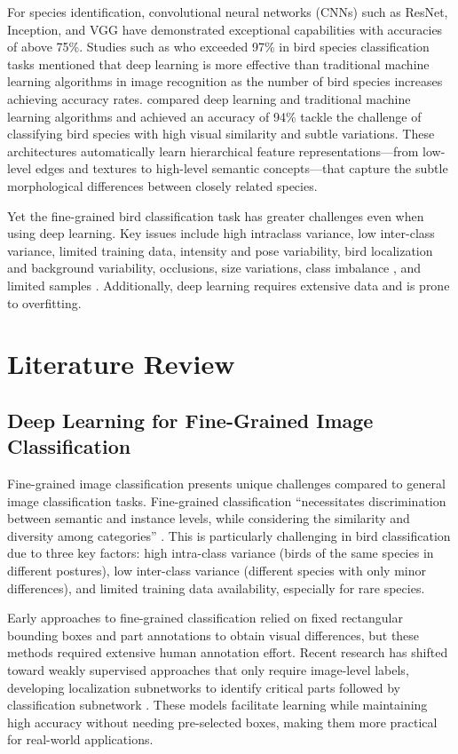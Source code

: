 \documentclass[a4paper,12pt]{report}
\begin{document}
For species identification, convolutional neural networks (CNNs) such as ResNet, Inception, and VGG have demonstrated exceptional capabilities \cite{essay101313} with accuracies of above 75\%. Studies such as \citep{transferln97} who exceeded 97\% in bird species classification tasks mentioned that deep learning is more effective than traditional machine learning algorithms in image recognition as the number of bird species increases achieving accuracy rates. \citep{ALFATEMI2024558} compared deep learning and traditional machine learning algorithms and achieved an accuracy of 94\% tackle the challenge of classifying bird species with high visual similarity and subtle variations. These architectures automatically learn hierarchical feature representations—from low-level edges and textures to high-level semantic concepts—that capture the subtle morphological differences between closely related species.

Yet the fine-grained bird classification task has greater challenges even when using deep learning. Key issues include high intraclass variance, low inter-class variance, limited training data, intensity and pose variability, bird localization and background variability, occlusions, size variations, class imbalance \citep{10.1007/978-981-15-1387-9_3}, and limited samples\cite{source3} \citep{ani13020264}. Additionally, deep learning requires extensive data and is prone to overfitting. 

\newpage
\chapter{Literature Review}
\section*{Deep Learning for Fine-Grained Image Classification}
Fine-grained image classification presents unique challenges compared to general image classification tasks. Fine-grained classification \enquote{necessitates discrimination between semantic and instance levels, while considering the similarity and diversity among categories} \citep{Lu2024}. This is particularly challenging in bird classification due to three key factors: high intra-class variance (birds of the same species in different postures), low inter-class variance (different species with only minor differences), and limited training data availability, especially for rare species\citep{Lu2024}.

Early approaches to fine-grained classification relied on fixed rectangular bounding boxes and part annotations to obtain visual differences, but these methods required extensive human annotation effort. Recent research has shifted toward weakly supervised approaches that only require image-level labels, developing localization subnetworks to identify critical parts followed by classification subnetwork \citep{Lu2024}. These models facilitate learning while maintaining high accuracy without needing pre-selected boxes, making them more practical for real-world applications.
\end{document}
